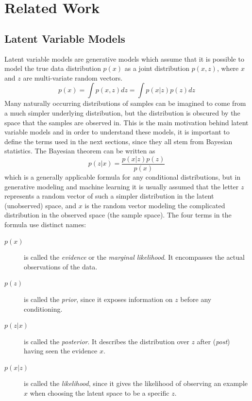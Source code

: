 %
\newpage
\chapter{Related Work}
\section{Latent Variable Models}
Latent variable models are generative models which assume that it is possible to model the true data distribution $p(x)$ as a joint distribution $p(x,z)$, where $x$ and $z$ are multi-variate random vectors.
\begin{equation}
    \label{eq:marginallikelihood}
    p(x) = \int p(x,z)dz = \int p(x|z)p(z)dz
\end{equation}
Many naturally occurring distributions of samples can be imagined to come from a much simpler underlying distribution, but the distribution is obscured by the space that the samples are observed in. This is the main motivation behind latent variable models and in order to understand these models, it is important to define the terms used in the next sections, since they all stem from Bayesian statistics. The Bayesian theorem can be written as
\begin{equation}
    \label{eq:bayestheorem}
    p(z|x) = \frac{p(x|z)p(z)}{p(x)}
\end{equation}
which is a generally applicable formula for any conditional distributions, but in generative modeling and machine learning it is usually assumed that the letter $z$ represents a random vector of such a simpler distribution in the latent (unobserved) space, and $x$ is the random vector modeling the complicated distribution in the observed space (the sample space). The four terms in the formula use distinct names:
\begin{description}
    \item[$p(x)$] is called the \textit{evidence} or the \textit{marginal likelihood}. It encompasses the actual observations of the data.
    \item[$p(z)$] is called the \textit{prior}, since it exposes information on $z$ before any conditioning.
    \item[$p(z|x)$] is called the \textit{posterior}. It describes the distribution over $z$ after (\textit{post}) having seen the evidence $x$.
    \item[$p(x|z)$] is called the \textit{likelihood}, since it gives the likelihood of observing an example $x$ when choosing the latent space to be a specific $z$.
\end{description}

